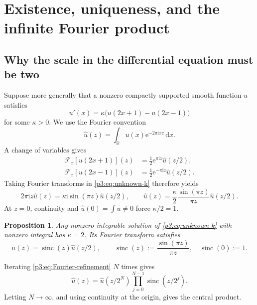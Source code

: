 \documentclass[11pt]{article}
\numberwithin{equation}{section}
\newtheorem{proposition}[theorem]{Proposition}
\theoremstyle{definition}
\theoremstyle{remark}
\newcommand{\R}{\mathbb R}
\newcommand{\sinc}{\operatorname{sinc}}
\newcommand{\dd}{\,\mathrm d}
\newcommand{\e}{\mathrm e}
\newcommand{\ii}{\mathrm i}
\begin{document}
\section{Existence, uniqueness, and the infinite Fourier product}\label{p3:sec:existence}

\subsection{Why the scale in the differential equation must be two}

Suppose more generally that a nonzero compactly supported smooth function $u$ satisfies
\begin{equation}\label{p3:eq:unknown-k}
 u'(x)=\kappa\bigl(u(2x+1)-u(2x-1)\bigr)
\end{equation}
for some $\kappa>0$.  We use the Fourier convention
\begin{equation}\label{p3:eq:Fourier-convention}
 \widehat u(z)=\int_{\R}u(x)\e^{-2\pi\ii xz}\dd x.
\end{equation}
A change of variables gives
\begin{align*}
 \mathcal F_x[u(2x+1)](z)&=\tfrac12\e^{\pi\ii z}\widehat u(z/2),\\
 \mathcal F_x[u(2x-1)](z)&=\tfrac12\e^{-\pi\ii z}\widehat u(z/2).
\end{align*}
Taking Fourier transforms in \eqref{p3:eq:unknown-k} therefore yields
\begin{equation}\label{p3:eq:Fourier-refinement-k}
 2\pi\ii z\widehat u(z)=\kappa\ii\sin(\pi z)\widehat u(z/2),
 \qquad
 \widehat u(z)=\frac{\kappa}{2}\frac{\sin(\pi z)}{\pi z}\widehat u(z/2).
\end{equation}
At $z=0$, continuity and $\widehat u(0)=\int u\ne0$ force $\kappa/2=1$.

\begin{proposition}\label{p3:prop:k-two}
Any nonzero integrable solution of \eqref{p3:eq:unknown-k} with nonzero integral has $\kappa=2$.  Its Fourier transform satisfies
\begin{equation}\label{p3:eq:Fourier-refinement}
 \widehat u(z)=\sinc(z)\widehat u(z/2),
 \qquad
 \sinc(z):=\frac{\sin(\pi z)}{\pi z},\quad \sinc(0):=1.
\end{equation}
\end{proposition}

Iterating \eqref{p3:eq:Fourier-refinement} $N$ times gives
\begin{equation}\label{p3:eq:finite-Fourier-product}
 \widehat u(z)=\widehat u(z/2^N)\prod_{j=0}^{N-1}\sinc(z/2^j).
\end{equation}
Letting $N\to\infty$, and using continuity at the origin, gives the central product.
\end{document}
